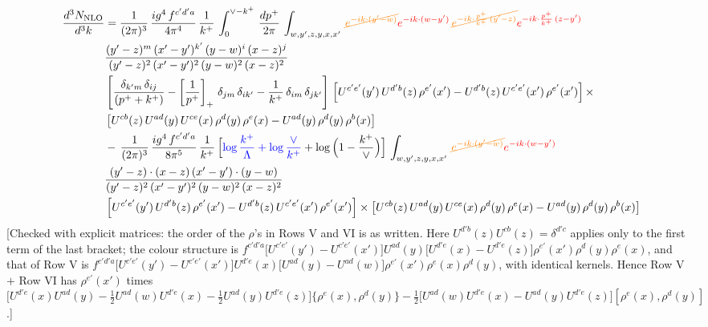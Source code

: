 \documentclass[9pt]{article}
\numberwithin{equation}{section}
\begin{document}
\begin{align}
    \frac{d^{3}N_{\rm NLO}}{d^{3}k} & = \frac{1}{(2\pi)^{3}}\, \frac{ig^{4}\,f^{c'd'a}}{4\pi^{4}}\, \frac{1}{k^{+}}\,\int_{0}^{\vee-k^{+}}\, \frac{dp^{+}}{2\pi}\, \int_{w,y',z,y,x,x'}\, {\color{orange}\cancel{e^{-ik\cdot (y'-w)}}}{\color{red}e^{-ik\cdot (w-y')}}\, {\color{orange}\cancel{e^{-ik\cdot \frac{p^{+}}{k^{+}}\,(y'-z)}}}{\color{red}e^{-ik\cdot \frac{p^{+}}{k^{+}}\,(z-y')}}\,\notag \\ & \frac{(y'-z)^{m}\,(x'-y')^{k'}\,(y-w)^{i}\,(x-z)^{j}}{(y'-z)^{2}\,(x'-y')^{2}\,(y-w)^{2}\,(x-z)^{2}}\notag \\ & \left[\frac{\delta_{k'm}\,\delta_{ij}}{(p^{+}+k^{+})}-\left[\frac{1}{p^{+}}\right]_{+}\,\delta_{jm}\,\delta_{ik'}-\frac{1}{k^{+}}\, \delta_{im}\, \delta_{jk'}\right]\, \left[U^{c'e'}(y')\,U^{d'b}(z)\,\rho^{e'}(x')-U^{d'b}(z)\,U^{c'e'}(x')\,\rho^{e'}(x')\right]\times\notag \\ &  \left[U^{cb}(z)\,U^{ad}(y)\,U^{ce}(x)\,\rho^{d}(y)\,\rho^{e}(x)-U^{ad}(y)\,\rho^{d}(y)\,\rho^{b}(x)\right]\notag \\ &  -\,\frac{1}{(2\pi)^{3}}\, \frac{ig^{4}\,f^{c'd'a}}{8\pi^{5}}\, \frac{1}{k^{+}}\,\Big[{\color{blue}\log\frac{k^{+}}{\Lambda}+\log\frac{\vee}{k^{+}}}+\log\Big(1-\frac{k^{+}}{\vee}\Big)\Big]\, \int_{w,y',z,y,x,x'}\, {\color{orange}\cancel{e^{-ik\cdot (y'-w)}}}{\color{red}e^{-ik\cdot (w-y')}}\,\notag \\ & \frac{(y'-z)\cdot (x-z)\,(x'-y')\cdot (y-w)}{(y'-z)^{2}\,(x'-y')^{2}\,(y-w)^{2}\,(x-z)^{2}}\notag \\ & \left[U^{c'e'}(y')\,U^{d'b}(z)\,\rho^{e'}(x')-U^{d'b}(z)\,U^{c'e'}(x')\,\rho^{e'}(x')\right]\times  \left[U^{cb}(z)\,U^{ad}(y)\,U^{ce}(x)\,\rho^{d}(y)\,\rho^{e}(x)-U^{ad}(y)\,\rho^{d}(y)\,\rho^{b}(x)\right]
\end{align} {\color{red}[Checked with explicit matrices: the order of the $\rho$'s in Rows V and VI is as written. Here $U^{d'b}(z)U^{cb}(z)=\delta^{d'c}$ applies only to the first term of the last bracket; the colour structure is $f^{c'd'a}\big[U^{c'e'}(y')-U^{c'e'}(x')\big]U^{ad}(y)\big[U^{d'e}(x)-U^{d'e}(z)\big]\rho^{e'}(x')\rho^{d}(y)\rho^{e}(x)$, and that of Row V is $f^{c'd'a}\big[U^{c'e'}(y')-U^{c'e'}(x')\big]U^{d'e}(x)\big[U^{ad}(y)-U^{ad}(w)\big]\rho^{e'}(x')\rho^{e}(x)\rho^{d}(y)$, with identical kernels. Hence Row V $+$ Row VI has $\rho^{e'}(x')$ times $\big[U^{d'e}(x)U^{ad}(y)-\frac12U^{ad}(w)U^{d'e}(x)-\frac12U^{ad}(y)U^{d'e}(z)\big]\{\rho^{e}(x),\rho^{d}(y)\}-\frac12\big[U^{ad}(w)U^{d'e}(x)-U^{ad}(y)U^{d'e}(z)\big][\rho^{e}(x),\rho^{d}(y)]$.]}\par\noindent 
\end{document}
